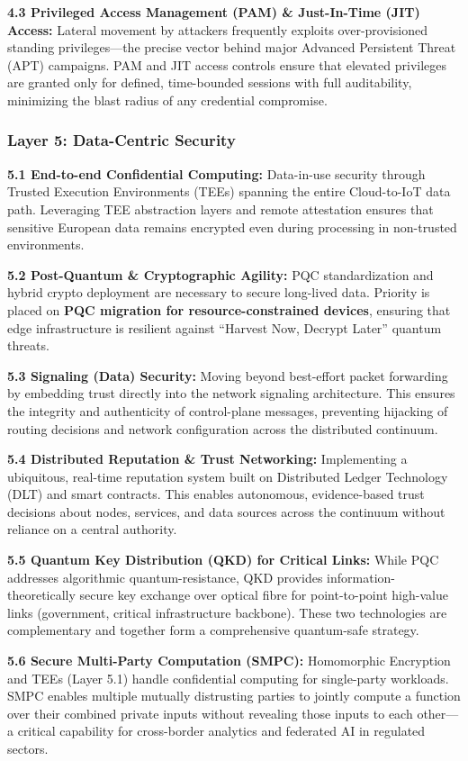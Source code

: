 \documentclass[12pt,a4paper]{report}
\begin{document}
\textbf{4.3 Privileged Access Management (PAM) \& Just-In-Time (JIT) Access:} Lateral movement by attackers frequently exploits over-provisioned standing privileges---the precise vector behind major Advanced Persistent Threat (APT) campaigns. PAM and JIT access controls ensure that elevated privileges are granted only for defined, time-bounded sessions with full auditability, minimizing the blast radius of any credential compromise.

\subsubsection*{Layer 5: Data-Centric Security}
\textbf{5.1 End-to-end Confidential Computing:} Data-in-use security through Trusted Execution Environments (TEEs) spanning the entire Cloud-to-IoT data path. Leveraging TEE abstraction layers and remote attestation ensures that sensitive European data remains encrypted even during processing in non-trusted environments.

\textbf{5.2 Post-Quantum \& Cryptographic Agility:} PQC standardization and hybrid crypto deployment are necessary to secure long-lived data. Priority is placed on \textbf{PQC migration for resource-constrained devices}, ensuring that edge infrastructure is resilient against ``Harvest Now, Decrypt Later'' quantum threats.

\textbf{5.3 Signaling (Data) Security:} Moving beyond best-effort packet forwarding by embedding trust directly into the network signaling architecture. This ensures the integrity and authenticity of control-plane messages, preventing hijacking of routing decisions and network configuration across the distributed continuum.

\textbf{5.4 Distributed Reputation \& Trust Networking:} Implementing a ubiquitous, real-time reputation system built on Distributed Ledger Technology (DLT) and smart contracts. This enables autonomous, evidence-based trust decisions about nodes, services, and data sources across the continuum without reliance on a central authority.

\textbf{5.5 Quantum Key Distribution (QKD) for Critical Links:} While PQC addresses algorithmic quantum-resistance, QKD provides information-theoretically secure key exchange over optical fibre for point-to-point high-value links (government, critical infrastructure backbone). These two technologies are complementary and together form a comprehensive quantum-safe strategy.

\textbf{5.6 Secure Multi-Party Computation (SMPC):} Homomorphic Encryption and TEEs (Layer 5.1) handle confidential computing for single-party workloads. SMPC enables multiple mutually distrusting parties to jointly compute a function over their combined private inputs without revealing those inputs to each other---a critical capability for cross-border analytics and federated AI in regulated sectors.
\end{document}
